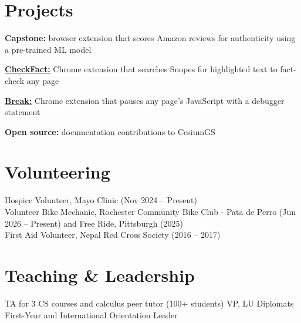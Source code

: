 \documentclass[]{deedy-resume-openfont}
\begin{document}
\begin{minipage}[t]{0.67\textwidth}
\section{Projects}
\vspace{\topsep}
\begin{tightemize}
\item {\bf Capstone:} browser extension that scores Amazon reviews for authenticity using a pre-trained ML model
\item \href{https://github.com/anmolshres/chrome-extension-snopes}{\bf CheckFact:} Chrome extension that searches Snopes for highlighted text to fact-check any page
\item \href{https://github.com/anmolshres/break}{\bf Break:} Chrome extension that pauses any page's JavaScript with a debugger statement
\item {\bf Open source:} documentation contributions to CesiumGS
\end{tightemize}
\sectionsep

\section{Volunteering}
Hospice Volunteer, Mayo Clinic (Nov 2024 – Present) \\
Volunteer Bike Mechanic, Rochester Community Bike Club - Pata de Perro (Jun 2026 – Present) and Free Ride, Pittsburgh (2025) \\
First Aid Volunteer, Nepal Red Cross Society (2016 – 2017)
\sectionsep

\section{Teaching \& Leadership}
TA for 3 CS courses and calculus peer tutor (100+ students) \textbullet{} VP, LU Diplomats \textbullet{} First-Year and International Orientation Leader

\end{minipage}
\end{document}
